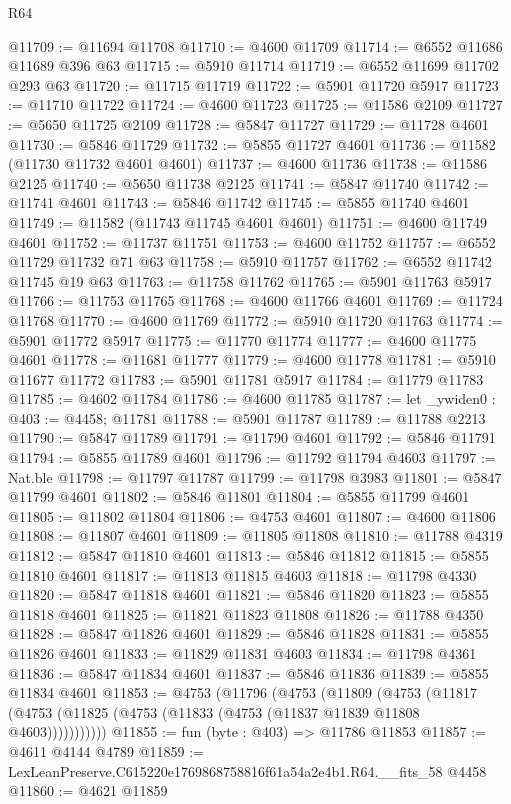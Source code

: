 \begin{lexlean}{R64}
\begin{coremodule}
@11709 := @11694 @11708
@11710 := @4600 @11709
@11714 := @6552 @11686 @11689 @396 @63
@11715 := @5910 @11714
@11719 := @6552 @11699 @11702 @293 @63
@11720 := @11715 @11719
@11722 := @5901 @11720 @5917
@11723 := @11710 @11722
@11724 := @4600 @11723
@11725 := @11586 @2109
@11727 := @5650 @11725 @2109
@11728 := @5847 @11727
@11729 := @11728 @4601
@11730 := @5846 @11729
@11732 := @5855 @11727 @4601
@11736 := @11582 (@11730 @11732 @4601 @4601)
@11737 := @4600 @11736
@11738 := @11586 @2125
@11740 := @5650 @11738 @2125
@11741 := @5847 @11740
@11742 := @11741 @4601
@11743 := @5846 @11742
@11745 := @5855 @11740 @4601
@11749 := @11582 (@11743 @11745 @4601 @4601)
@11751 := @4600 @11749 @4601
@11752 := @11737 @11751
@11753 := @4600 @11752
@11757 := @6552 @11729 @11732 @71 @63
@11758 := @5910 @11757
@11762 := @6552 @11742 @11745 @19 @63
@11763 := @11758 @11762
@11765 := @5901 @11763 @5917
@11766 := @11753 @11765
@11768 := @4600 @11766 @4601
@11769 := @11724 @11768
@11770 := @4600 @11769
@11772 := @5910 @11720 @11763
@11774 := @5901 @11772 @5917
@11775 := @11770 @11774
@11777 := @4600 @11775 @4601
@11778 := @11681 @11777
@11779 := @4600 @11778
@11781 := @5910 @11677 @11772
@11783 := @5901 @11781 @5917
@11784 := @11779 @11783
@11785 := @4602 @11784
@11786 := @4600 @11785
@11787 := let _ywiden0 : @403 := @4458; @11781
@11788 := @5901 @11787
@11789 := @11788 @2213
@11790 := @5847 @11789
@11791 := @11790 @4601
@11792 := @5846 @11791
@11794 := @5855 @11789 @4601
@11796 := @11792 @11794 @4603
@11797 := Nat.ble
@11798 := @11797 @11787
@11799 := @11798 @3983
@11801 := @5847 @11799 @4601
@11802 := @5846 @11801
@11804 := @5855 @11799 @4601
@11805 := @11802 @11804
@11806 := @4753 @4601
@11807 := @4600 @11806
@11808 := @11807 @4601
@11809 := @11805 @11808
@11810 := @11788 @4319
@11812 := @5847 @11810 @4601
@11813 := @5846 @11812
@11815 := @5855 @11810 @4601
@11817 := @11813 @11815 @4603
@11818 := @11798 @4330
@11820 := @5847 @11818 @4601
@11821 := @5846 @11820
@11823 := @5855 @11818 @4601
@11825 := @11821 @11823 @11808
@11826 := @11788 @4350
@11828 := @5847 @11826 @4601
@11829 := @5846 @11828
@11831 := @5855 @11826 @4601
@11833 := @11829 @11831 @4603
@11834 := @11798 @4361
@11836 := @5847 @11834 @4601
@11837 := @5846 @11836
@11839 := @5855 @11834 @4601
@11853 := @4753
    (@11796
      (@4753
        (@11809
          (@4753 (@11817 (@4753 (@11825 (@4753 (@11833 (@4753 (@11837 @11839 @11808 @4603)))))))))))
@11855 := fun (byte : @403) => @11786 @11853
@11857 := @4611 @4144 @4789
@11859 := LexLeanPreserve.C615220e1769868758816f61a54a2e4b1.R64.__fits_58 @4458
@11860 := @4621 @11859

\end{coremodule}
\end{lexlean}
